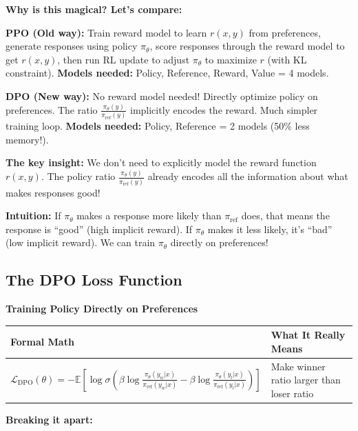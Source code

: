 \begin{chapterenv}
\textbf{Why is this magical? Let's compare:}

\textbf{PPO (Old way):} Train reward model to learn $r(x,y)$ from preferences, generate responses using policy $\pi_\theta$, score responses through the reward model to get $r(x,y)$, then run RL update to adjust $\pi_\theta$ to maximize $r$ (with KL constraint). \textbf{Models needed:} Policy, Reference, Reward, Value = 4 models.

\textbf{DPO (New way):} No reward model needed! Directly optimize policy on preferences. The ratio $\frac{\pi_\theta(y)}{\pi_{\text{ref}}(y)}$ implicitly encodes the reward. Much simpler training loop. \textbf{Models needed:} Policy, Reference = 2 models (50\% less memory!).

\begin{infobox}
\textbf{The key insight:} We don't need to explicitly model the reward function $r(x,y)$. The policy ratio $\frac{\pi_\theta(y)}{\pi_{\text{ref}}(y)}$ already encodes all the information about what makes responses good!

\textbf{Intuition:} If $\pi_\theta$ makes a response more likely than $\pi_{\text{ref}}$ does, that means the response is ``good'' (high implicit reward). If $\pi_\theta$ makes it less likely, it's ``bad'' (low implicit reward). We can train $\pi_\theta$ directly on preferences!
\end{infobox}

\subsection{The DPO Loss Function}

\begin{infobox}
\textbf{Training Policy Directly on Preferences}

\begin{center}
\begin{tabular}{p{}p{}}
\toprule
\textbf{Formal Math} & \textbf{What It Really Means} \\
\midrule
$\mathcal{L}_{\text{DPO}}(\theta) = -\mathbb{E}\!\left[\log \sigma\!\left(\beta \log \frac{\pi_\theta(y_w|x)}{\pi_{\text{ref}}(y_w|x)} - \beta \log \frac{\pi_\theta(y_l|x)}{\pi_{\text{ref}}(y_l|x)}\right)\right]$ & Make winner ratio larger than loser ratio \\
\bottomrule
\end{tabular}
\end{center}

\textbf{Breaking it apart:}


\end{infobox}
\end{chapterenv}
